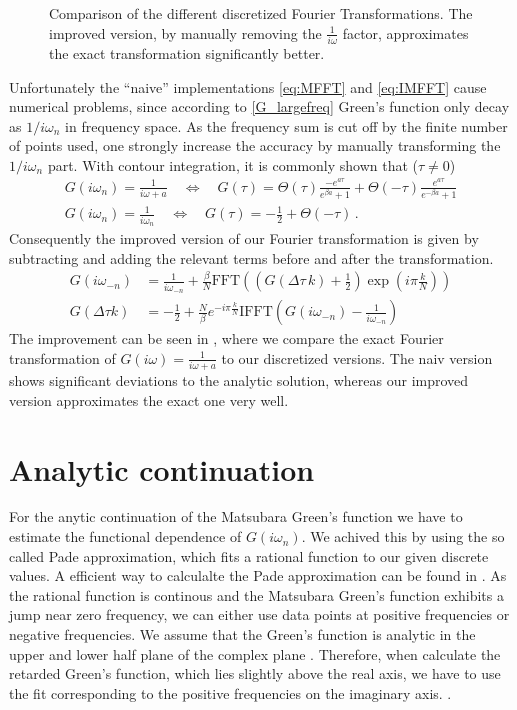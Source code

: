 \begin{appendix}
\begin{figure}[h]
	\caption{Comparison of the different discretized Fourier Transformations. The improved version, by manually removing the $\frac{1}{i \omega}$ factor, approximates the exact transformation significantly better. }
	\label{fig:fourier_traf}
\end{figure}

Unfortunately the ``naive'' implementations \eqref{eq:MFFT} and \eqref{eq:IMFFT} cause numerical problems, since according to \eqref{G_largefreq} Green's function only decay as $1/ i\omega_n$ in frequency space. As the frequency sum is cut off by the finite number of points used, one strongly increase the accuracy by manually transforming the $1/ i\omega_n$ part. With contour integration, it is commonly shown that ($\tau \neq 0$)
%
\begin{gather}
G(i\omega_n) = \frac{1}{i\omega + a}
\quad \Leftrightarrow \quad
G(\tau) = \Theta(\tau) \frac{- e^{a \tau}}{e^{\beta a}+1} + \Theta(-\tau) \frac{e^{a \tau}}{e^{-\beta a}+1} 
\\
	G(i ω_n) =\frac{1}{i ω_n} \quad ⇔ \quad G(τ)=-\frac{1}{2} + \Theta(-\tau)
	\label{eq:ff_pair}
\, .
\end{gather}
Consequently the improved version of our Fourier transformation is given by subtracting and adding the relevant terms before and after the transformation.
\begin{align}
	G(i ω_{-n})&= \frac{1}{i ω_{-n}}+\frac{\beta}{N} \mathrm{FFT}\left( \left(G(\Delta τ \, k)+\frac{1}{2}\right)\exp{\left(i π \frac{k}{N}\right)}\right)\\
	G(\Delta τ k)&= -\frac{1}{2}+\frac{N}{β} e^{-i π \frac{k}{N}}\mathrm{IFFT}\left(G(iω_{-n})-\frac{1}{i ω_{-n}}\right)
	\label{eq:improved_fft}
\end{align}
The improvement can be seen in , where we compare the exact Fourier transformation of $G(i ω)=\frac{1}{iω+a}$ to our discretized versions. The naiv version shows significant deviations to the analytic solution, whereas our improved version approximates the exact one very well.  

\section{Analytic continuation}
For the anytic continuation of the Matsubara Green's function we have to estimate the functional dependence of $G(iω_n)$. We achived this by using the so called Pade approximation, which fits a rational function to our given discrete values. A efficient way to calculalte the Pade approximation can be found in . As the rational function is continous and the Matsubara Green's function exhibits a jump near zero frequency, we can either use data points at positive frequencies or negative frequencies. We assume that the Green's function is analytic in the upper and lower half plane of the complex plane . Therefore, when calculate the retarded Green's function, which lies slightly above the real axis, we have to use the fit corresponding to the positive frequencies on the imaginary axis. . 


\end{appendix}
